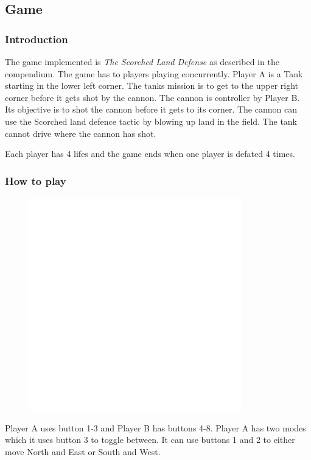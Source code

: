 \subsection{Game}

\subsubsection{Introduction}
The game implemented is {\it The Scorched Land Defense} as described in the compendium. The game has
to players playing concurrently. Player A is a Tank starting in the lower left corner. The tanks
mission is to get to the upper right corner before it gets shot by the cannon. The cannon is
controller by Player B. Its objective is to shot the cannon before it gets to its corner. The cannon
can use the Scorched land defence tactic by blowing up land in the field. The tank cannot drive
where the cannon has shot.

Each player has 4 lifes and the game ends when one player is defated 4 times.

\subsubsection{How to play}

\begin{figure}[h]
  \includegraphics[width=350px]{graphics/game_screen_with_buttons.png}

\end{figure}

Player A uses button 1-3 and Player B has buttons 4-8. Player A has two modes which it uses button 3
to toggle between. It can use buttons 1 and 2 to either move North and East or South and West.

